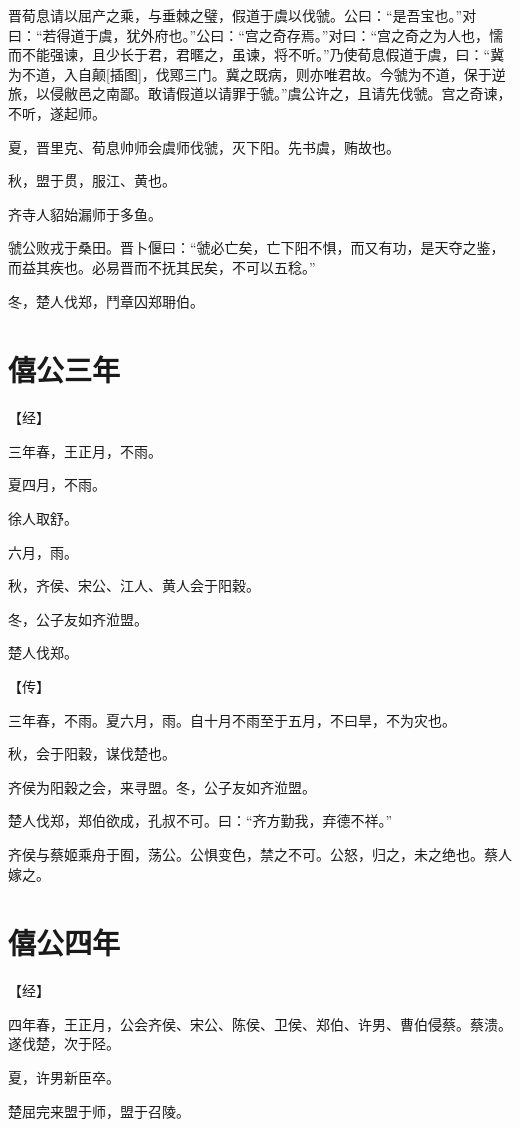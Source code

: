\documentclass[a4paper,12pt,UTF8,twoside]{ctexbook}
\begin{document}
晋荀息请以屈产之乘，与垂棘之璧，假道于虞以伐虢。公曰：“是吾宝也。”对曰：“若得道于虞，犹外府也。”公曰：“宫之奇存焉。”对曰：“宫之奇之为人也，懦而不能强谏，且少长于君，君暱之，虽谏，将不听。”乃使荀息假道于虞，曰：“冀为不道，入自颠[插图]，伐鄍三门。冀之既病，则亦唯君故。今虢为不道，保于逆旅，以侵敝邑之南鄙。敢请假道以请罪于虢。”虞公许之，且请先伐虢。宫之奇谏，不听，遂起师。

夏，晋里克、荀息帅师会虞师伐虢，灭下阳。先书虞，贿故也。

秋，盟于贯，服江、黄也。

齐寺人貂始漏师于多鱼。

虢公败戎于桑田。晋卜偃曰：“虢必亡矣，亡下阳不惧，而又有功，是天夺之鉴，而益其疾也。必易晋而不抚其民矣，不可以五稔。”

冬，楚人伐郑，鬥章囚郑耼伯。


\section{僖公三年}


【经】

三年春，王正月，不雨。

夏四月，不雨。

徐人取舒。

六月，雨。

秋，齐侯、宋公、江人、黄人会于阳穀。

冬，公子友如齐涖盟。

楚人伐郑。

【传】

三年春，不雨。夏六月，雨。自十月不雨至于五月，不曰旱，不为灾也。

秋，会于阳穀，谋伐楚也。

齐侯为阳穀之会，来寻盟。冬，公子友如齐涖盟。

楚人伐郑，郑伯欲成，孔叔不可。曰：“齐方勤我，弃德不祥。”

齐侯与蔡姬乘舟于囿，荡公。公惧变色，禁之不可。公怒，归之，未之绝也。蔡人嫁之。

\section{僖公四年}




【经】

四年春，王正月，公会齐侯、宋公、陈侯、卫侯、郑伯、许男、曹伯侵蔡。蔡溃。遂伐楚，次于陉。

夏，许男新臣卒。

楚屈完来盟于师，盟于召陵。
\end{document}
